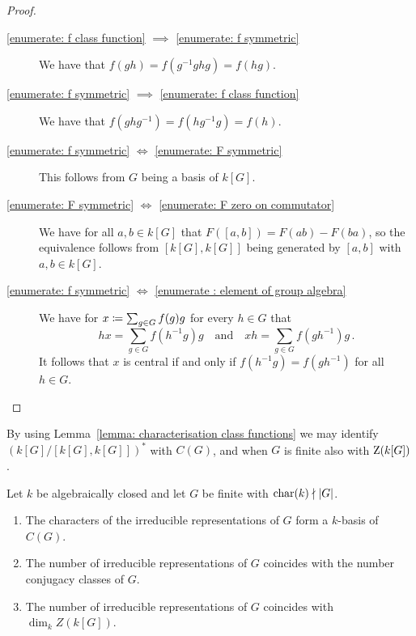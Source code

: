 \begin{proof}
  \leavevmode
  \begin{description}
    \item[\ref*{enumerate: f class function} $\implies$ \ref*{enumerate: f symmetric}]
      We have that $f(gh) = f(g^{-1} gh g) = f(hg)$.
    \item[\ref*{enumerate: f symmetric} $\implies$ \ref*{enumerate: f class function}]
      We have that $f(ghg^{-1}) = f(h g^{-1} g) = f(h)$.
    \item[\ref*{enumerate: f symmetric} $\iff$ \ref*{enumerate: F symmetric}]
      This follows from $G$ being a basis of $k[G]$.
    \item[\ref*{enumerate: F symmetric} $\iff$ \ref*{enumerate: F zero on commutator}]
      We have for all $a, b \in k[G]$ that $F([a,b]) = F(ab) - F(ba)$, so the equivalence follows from $[k[G], k[G]]$ being generated by $[a,b]$ with $a,b \in k[G]$.
    \item[\ref*{enumerate: f symmetric} $\iff$ \ref*{enumerate : element of group algebra}]
      We have for $x \coloneqq \sum_{g \in G} f(g) g$ for every $h \in G$ that
      \[
          h x
        = \sum_{g \in G} f(h^{-1} g) g
        \quad\text{and}\quad
          x h
        = \sum_{g \in G} f(g h^{-1}) g \,.
      \]
      It follows that $x$ is central if and only if $f(h^{-1} g) = f(g h^{-1})$ for all $h \in G$.
    \qedhere
  \end{description}
\end{proof}


\begin{fluff}
  By using Lemma~\ref{lemma: characterisation class functions} we may identify $(k[G]/[k[G], k[G]])^*$ with $C(G)$, and when $G$ is finite also with $\operatorname{Z}(k[G])$.
\end{fluff}




\begin{proposition}
  \label{proposition: conjugacy classes and irreducible representations}
  Let $k$ be algebraically closed and let $G$ be finite with $\operatorname{char}(k) \nmid |G|$.
  \begin{enumerate}
    \item
      \label{enumerate: characters are basis of class functions}
     The characters of the irreducible representations of $G$ form a $k$-basis of $C(G)$.
    \item
      \label{enumerate: number of irr rep is number of conjugacy classes}
      The number of irreducible representations of $G$ coincides with the number conjugacy classes of $G$.
    \item
      \label{enumerate: number of irr rep is dim of center}
      The number of irreducible representations of $G$ coincides with $\dim_k Z(k[G])$.
  \end{enumerate}
\end{proposition}


